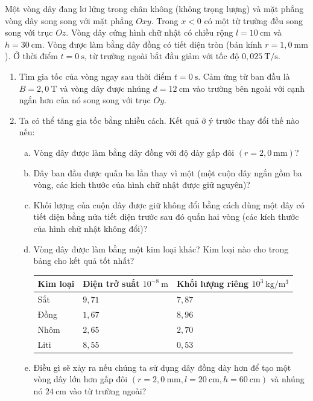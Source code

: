 \begin{vd}
Một vòng dây đang lơ lửng trong chân không (không trọng lượng) và mặt phẳng vòng dây song song với mặt phẳng $Oxy$. Trong  $ x <0 $ có một từ trường đều song song với trục $Oz$. Vòng dây cứng hình chữ nhật có chiều rộng $ l=10 \mathrm {~ cm} $ và $ h = 30 \mathrm {~ cm} $. Vòng được làm bằng dây đồng có tiết diện tròn (bán kính $ r = 1,0 \mathrm {~ mm}$). Ở thời điểm  $ t = 0 \mathrm {~ s} $, từ trường ngoài bắt đầu giảm với tốc độ $ 0,025 \mathrm {~ T} / \mathrm {s} $.
\begin{enumerate}[1)]
    \item Tìm gia tốc của vòng ngay sau thời điểm $ t = 0 \mathrm {~ s} $. Cảm ứng từ ban đầu là $ B = 2,0 \mathrm {~T} $ và vòng dây được nhúng $ d = 12 \mathrm {~cm} $ vào trường bên ngoài với cạnh ngắn hơn của nó song song với trục $Oy$.
    \item Ta có thể tăng gia tốc bằng nhiều cách. Kết quả ở ý trước thay đổi thế nào nếu:
    \begin{enumerate}[a)]
        \item Vòng dây được làm bằng dây đồng với độ dày gấp đôi $(r = 2,0 \mathrm {~ mm})$?
        \item Dây ban đầu được quấn ba lần thay vì một (một cuộn dây ngắn gồm ba vòng, các kích thước của hình chữ nhật được giữ nguyên)?
        \item Khối lượng của cuộn dây được giữ không đổi bằng cách dùng một dây có tiết diện bằng nửa tiết diện trước sau đó quấn hai vòng (các kích thước của hình chữ nhật không đổi)? 
        \item Vòng dây được làm bằng một kim loại khác? Kim loại nào cho trong bảng cho kết quả tốt nhất?
        
    \begin{center}
        \begin{tabular}{|l|l|l|}
        \hline Kim loại & Điện trở suất $10^{-8} \mathrm{~m}$ & Khối lượng riêng $10^{3} \mathrm{~kg} / \mathrm{m}^{3}$ \\
        \hline Sắt & $9,71$ & $7,87$ \\
        \hline Đồng & $1,67$ & $8,96$ \\
        \hline Nhôm & $2,65$ & $2,70$ \\
        \hline Liti & $8,55$ & $0,53$ \\
        \hline
        \end{tabular}
        \end{center}
        
        \item Điều gì sẽ xảy ra nếu chúng ta sử dụng dây đồng dày hơn
         để tạo một vòng dây lớn hơn gấp đôi $ (r = 2,0 \mathrm {~ mm}, l=20 \mathrm {~ cm}, h = 60 \mathrm {~ cm}) $ và nhúng nó $ 24 \mathrm {~ cm} $ vào từ trường ngoài?
    \end{enumerate}
\end{enumerate}
\end{vd}
